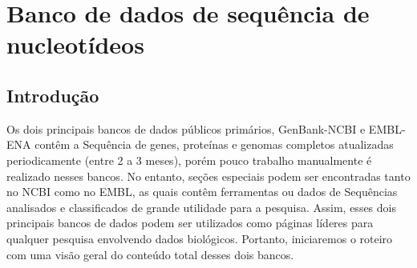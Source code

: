 \section{Banco de dados de sequência de nucleotídeos}

\subsection{Introdução}

Os dois principais bancos de dados públicos primários, GenBank-NCBI e EMBL-ENA contêm a Sequência de genes, proteínas e genomas completos atualizadas periodicamente (entre 2 a 3 meses), porém pouco trabalho manualmente é realizado nesses bancos. 
No entanto, seções especiais podem ser encontradas tanto no NCBI como no EMBL, as quais contêm ferramentas ou dados de Sequências analisados e classificados de grande utilidade para a pesquisa.  Assim, esses dois principais bancos de dados podem ser utilizados como páginas líderes para qualquer pesquisa envolvendo dados biológicos.
Portanto, iniciaremos o roteiro com uma visão geral do conteúdo total desses dois bancos.   
